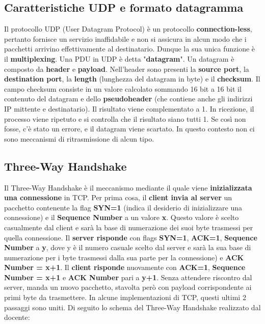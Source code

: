 \documentclass[12pt]{article}
\begin{document}
\subsection{Caratteristiche UDP e formato datagramma}

Il protocollo UDP (User Datagram Protocol) è un protocollo \textbf{connection-less}, pertanto fornisce un servizio inaffidabile e non si assicura in alcun modo che i pacchetti arrivino effettivamente al destinatario. Dunque la sua unica funzione è il \textbf{multiplexing}. Una PDU in UDP è detta "\textbf{datagram}".
Un datagram è composto da \textbf{header} e \textbf{payload}. Nell'header sono presenti la \textbf{source port}, la \textbf{destination port}, la \textbf{length} (lunghezza del datagram in byte) e il \textbf{checksum}. Il campo checksum consiste in un valore calcolato sommando 16 bit a 16 bit il contenuto del datagram e dello \textbf{pseudoheader} (che contiene anche gli indirizzi IP mittente e destinatario). Il risultato viene complementato a 1. In ricezione, il processo viene ripetuto e si controlla che il risultato siano tutti 1. Se così non fosse, c'è stato un errore, e il datagram viene scartato. In questo contesto non ci sono meccanismi di ritrasmissione di alcun tipo.

\subsection{Three-Way Handshake}

Il Three-Way Handshake è il meccanismo mediante il quale viene \textbf{inizializzata una connessione} in TCP.
Per prima cosa, il \textbf{client invia al server} un pacchetto contenente la flag \textbf{SYN=1} (indica il desiderio di inizializzare una connessione) e il \textbf{Sequence Number} a un valore \textbf{x}. Questo valore è scelto casualmente dal client e sarà la base di numerazione dei suoi byte trasmessi per quella connessione. Il \textbf{server risponde} con flags \textbf{SYN=1}, \textbf{ACK=1}, \textbf{Sequence Number} a \textbf{y}, dove y è il numero casuale scelto dal server e sarà la sua base di numerazione per i byte trasmessi dalla sua parte per la connessione) e \textbf{ACK Number = x+1}.
Il \textbf{client risponde} nuovamente con \textbf{ACK=1}, \textbf{Sequence Number = x+1} e \textbf{ACK Number} pari a \textbf{y+1}. Senza attendere riscontro dal server, manda un nuovo pacchetto, stavolta però con payload corrispondente ai primi byte da trasmettere. In alcune implementazioni di TCP, questi ultimi 2 passaggi sono uniti. Di seguito lo schema del Three-Way Handshake realizzato dal docente:
\end{document}
